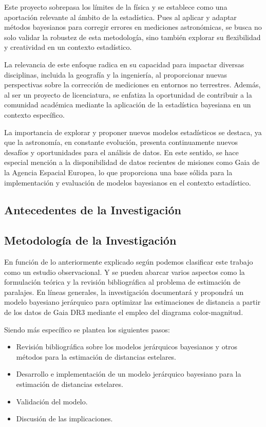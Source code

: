 \documentclass[stu, 12pt, letterpaper, donotrepeattitle, floatsintext, natbib]{apa7}
\begin{document}
Este proyecto sobrepasa los límites de la física y se establece como una
aportación relevante al ámbito de la estadística. Pues al aplicar y adaptar
métodos bayesianos para corregir errores en mediciones astronómicas,
se busca no solo validar la robustez de esta metodología, sino también
explorar su flexibilidad y creatividad en un contexto estadístico.

La relevancia de este enfoque radica en su capacidad para impactar diversas
disciplinas, incluida la geografía y la ingeniería, al proporcionar nuevas
perspectivas sobre la corrección de mediciones en entornos no terrestres.
Además, al ser un proyecto de licenciatura, se enfatiza la oportunidad de
contribuir a la comunidad académica mediante la aplicación de la estadística
bayesiana en un contexto específico.

La importancia de explorar y proponer nuevos modelos estadísticos se destaca,
ya que la astronomía, en constante evolución, presenta continuamente nuevos
desafíos y oportunidades para el análisis de datos. En este sentido, se hace
especial mención a la disponibilidad de datos recientes de misiones como Gaia
de la Agencia Espacial Europea, lo que proporciona una base sólida para la
implementación y evaluación de modelos bayesianos en el contexto estadístico.

\subsection{Antecedentes de la Investigación}
\subsection{Metodología de la Investigación}

En función de lo anteriormente explicado según  podemos
clasificar este trabajo como un estudio observacional. Y se pueden abarcar
varios aspectos como la formulación teórica y la revisión bibliográfica al
problema de estimación de paralajes. En líneas generales, la investigación
documentará y propondrá un modelo bayesiano jerárquico para optimizar las
estimaciones de distancia a partir de los datos de Gaia DR3 mediante el
empleo del diagrama color-magnitud.

Siendo más específico se plantea los siguientes pasos:

\begin{itemize}
    \item Revisión bibliográfica sobre los modelos jerárquicos bayesianos y otros métodos para la estimación de distancias estelares.
    \item Desarrollo e implementación de un modelo jerárquico bayesiano para la estimación de distancias estelares.
    \item Validación del modelo.
    \item Discusión de las implicaciones.
\end{itemize}
\end{document}
